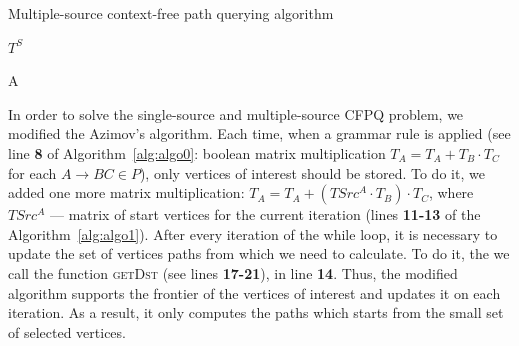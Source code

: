 \begin{algorithm}
\begin{algorithmic}[1]
\caption{Multiple-source context-free path querying algorithm}
\label{alg:algo1}


     
    \EndFor

     
        \EndFor
    \EndFor

     
        \EndFor
    \EndWhile
    \State \Return $T^S$
\EndFunction



    \EndFor
    \State \Return A
\EndFunction
\end{algorithmic}
\end{algorithm}

In order to solve the single-source and multiple-source CFPQ problem, we modified the Azimov's algorithm.
Each time, when a grammar rule is applied (see line \textbf{8} of Algorithm~\ref{alg:algo0}: boolean matrix multiplication $T_A = T_A + T_B \cdot T_C$ for each $A \rightarrow BC \in P$), only vertices of interest should be stored.
To do it, we added one more matrix multiplication: $T_A = T_A + (TSrc^A \cdot T_B) \cdot T_C$, where $TSrc^A$ --- matrix of start vertices for the current iteration (lines \textbf{11-13} of the Algorithm~\ref{alg:algo1}).
After every iteration of the while loop, it is necessary to update the set of vertices paths from which we need to calculate.
To do it, the we call the function \textsc{getDst} (see lines \textbf{17-21}), in line \textbf{14}.
Thus, the modified algorithm supports the frontier of the vertices of interest and updates it on each iteration.
As a result, it only computes the paths which starts from the small set of selected vertices.

